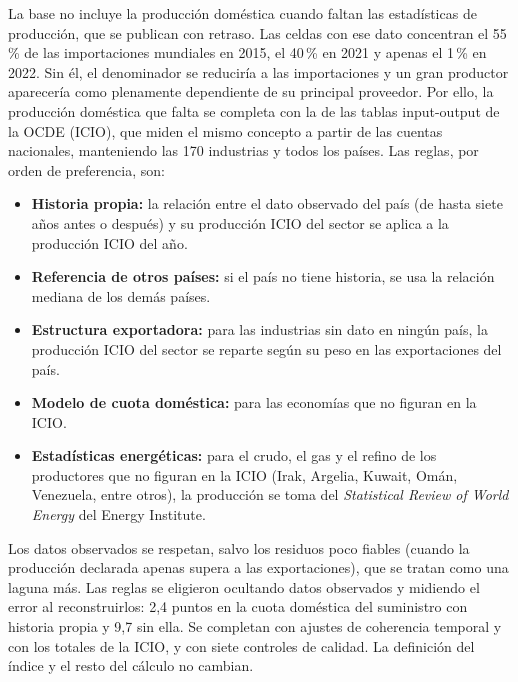 \documentclass[final,1p,times,authoryear]{elsarticle}
\begin{document}
La base no incluye la producción doméstica cuando faltan las estadísticas de producción, que se publican con retraso. Las celdas con ese dato concentran el 55\,\% de las importaciones mundiales en 2015, el 40\,\% en 2021 y apenas el 1\,\% en 2022. Sin él, el denominador se reduciría a las importaciones y un gran productor aparecería como plenamente dependiente de su principal proveedor. Por ello, la producción doméstica que falta se completa con la de las tablas input-output de la OCDE (ICIO), que miden el mismo concepto a partir de las cuentas nacionales, manteniendo las 170 industrias y todos los países. Las reglas, por orden de preferencia, son:
\begin{itemize}
    \item \textbf{Historia propia:} la relación entre el dato observado del país (de hasta siete años antes o después) y su producción ICIO del sector se aplica a la producción ICIO del año.
    \item \textbf{Referencia de otros países:} si el país no tiene historia, se usa la relación mediana de los demás países.
    \item \textbf{Estructura exportadora:} para las industrias sin dato en ningún país, la producción ICIO del sector se reparte según su peso en las exportaciones del país.
    \item \textbf{Modelo de cuota doméstica:} para las economías que no figuran en la ICIO.
    \item \textbf{Estadísticas energéticas:} para el crudo, el gas y el refino de los productores que no figuran en la ICIO (Irak, Argelia, Kuwait, Omán, Venezuela, entre otros), la producción se toma del \textit{Statistical Review of World Energy} del Energy Institute.
\end{itemize}
Los datos observados se respetan, salvo los residuos poco fiables (cuando la producción declarada apenas supera a las exportaciones), que se tratan como una laguna más. Las reglas se eligieron ocultando datos observados y midiendo el error al reconstruirlos: 2,4 puntos en la cuota doméstica del suministro con historia propia y 9,7 sin ella. Se completan con ajustes de coherencia temporal y con los totales de la ICIO, y con siete controles de calidad. La definición del índice y el resto del cálculo no cambian.
\end{document}

